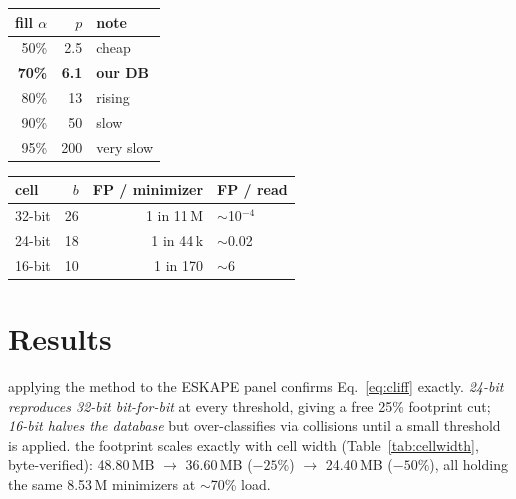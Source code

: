 \documentclass[10.5pt]{article}
\begin{document}
\begin{table}[h!]
\centering\footnotesize
\begin{minipage}[t]{0.44\textwidth}\centering
\begin{tabular}{@{}rrl@{}}
\toprule
\textbf{fill $\alpha$} & \textbf{$p$} & \textbf{note} \\
\midrule
50\% & 2.5 & cheap \\
\textbf{70\%} & \textbf{6.1} & \textbf{our DB} \\
80\% & 13 & rising \\
90\% & 50 & slow \\
95\% & 200 & very slow \\
\bottomrule
\end{tabular}
\label{tab:load}
\end{minipage}\hfill
\begin{minipage}[t]{0.52\textwidth}\centering
\begin{tabular}{@{}lrrl@{}}
\toprule
\textbf{cell} & \textbf{$b$} & \textbf{FP / minimizer} & \textbf{FP / read} \\
\midrule
32-bit & 26 & 1 in 11\,M & $\sim$10$^{-4}$ \\
24-bit & 18 & 1 in 44\,k & $\sim$0.02 \\
16-bit & 10 & 1 in 170  & $\sim$6 \\
\bottomrule
\end{tabular}
\label{tab:fplaw}
\end{minipage}
\end{table}

\section{Results}

applying the method to the ESKAPE panel confirms Eq.~\eqref{eq:cliff} exactly. \emph{24-bit reproduces 32-bit bit-for-bit} at every threshold, giving a free 25\% footprint cut; \emph{16-bit halves the database} but over-classifies via collisions until a small threshold is applied. the footprint scales exactly with cell width (Table~\ref{tab:cellwidth}, byte-verified): 48.80\,MB $\to$ 36.60\,MB ($-25\%$) $\to$ 24.40\,MB ($-50\%$), all holding the same 8.53\,M minimizers at $\sim$70\% load.
\end{document}

